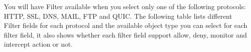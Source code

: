 You will have Filter available when you select only one of the following protocols: HTTP, SSL, DNS, MAIL, FTP and QUIC. 
The following table lists different Filter fields for each protocol and the available object type you can select for each filter field, 
it also shows whether each filter field support allow, deny, monitor and intercept action or not. 


%
